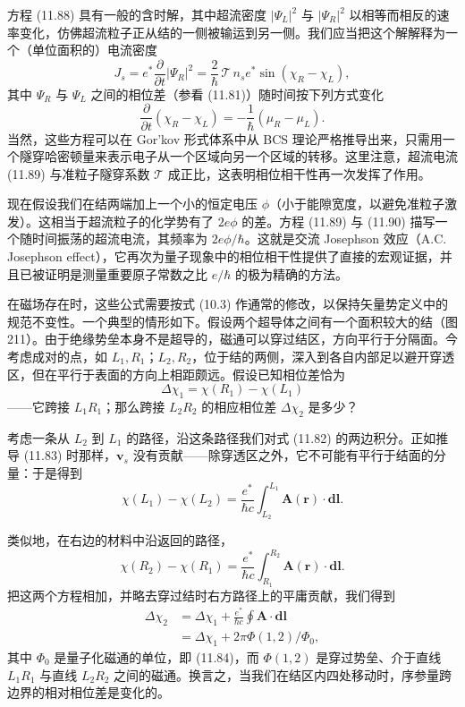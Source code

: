 方程 (11.88) 具有一般的含时解，其中超流密度 $|\Psi_L|^{2}$ 与 $|\Psi_R|^{2}$ 以相等而相反的速率变化，仿佛超流粒子正从结的一侧被输运到另一侧。我们应当把这个解解释为一个（单位面积的）电流密度
\begin{equation*}
J_s = e^{*}\frac{\partial}{\partial t}|\Psi_R|^{2} = \frac{2}{\hbar}\,\mathcal{T}\,n_s e^{*}\sin(\chi_R - \chi_L),
\tag{11.89}
\end{equation*}
其中 $\Psi_R$ 与 $\Psi_L$ 之间的相位差（参看 (11.81)）随时间按下列方式变化
\begin{equation*}
\frac{\partial}{\partial t}(\chi_R - \chi_L) = -\frac{1}{\hbar}(\mu_R - \mu_L).
\tag{11.90}
\end{equation*}
当然，这些方程可以在 Gor'kov 形式体系中从 BCS 理论严格推导出来，只需用一个隧穿哈密顿量来表示电子从一个区域向另一个区域的转移。这里注意，超流电流 (11.89) 与准粒子隧穿系数 $\mathcal{T}$ 成正比，这表明相位相干性再一次发挥了作用。

现在假设我们在结两端加上一个小的恒定电压 $\phi$（小于能隙宽度，以避免准粒子激发）。这相当于超流粒子的化学势有了 $2e\phi$ 的差。方程 (11.89) 与 (11.90) 描写一个随时间振荡的超流电流，其频率为 $2e\phi/\hbar$。这就是交流 Josephson 效应（A.C. Josephson effect），它再次为量子现象中的相位相干性提供了直接的宏观证据，并且已被证明是测量重要原子常数之比 $e/\hbar$ 的极为精确的方法。

在磁场存在时，这些公式需要按式 (10.3) 作通常的修改，以保持矢量势定义中的规范不变性。一个典型的情形如下。假设两个超导体之间有一个面积较大的结（图 211）。由于绝缘势垒本身不是超导的，磁通可以穿过结区，方向平行于分隔面。今考虑成对的点，如 $L_1,R_1$；$L_2,R_2$，位于结的两侧，深入到各自内部足以避开穿透区，但在平行于表面的方向上相距颇远。假设已知相位差恰为
\begin{equation*}
\Delta\chi_1 = \chi(R_1) - \chi(L_1)
\tag{11.91}
\end{equation*}
——它跨接 $L_1R_1$；那么跨接 $L_2R_2$ 的相应相位差 $\Delta\chi_2$ 是多少？

考虑一条从 $L_2$ 到 $L_1$ 的路径，沿这条路径我们对式 (11.82) 的两边积分。正如推导 (11.83) 时那样，$\mathbf{v}_s$ 没有贡献——除穿透区之外，它不可能有平行于结面的分量：于是得到
\begin{equation*}
\chi(L_1) - \chi(L_2) = \frac{e^{*}}{\hbar c}\int_{L_2}^{L_1}\mathbf{A}(\mathbf{r})\cdot\mathbf{dl}.
\tag{11.92}
\end{equation*}


类似地，在右边的材料中沿返回的路径，
\begin{equation*}
\chi(R_2) - \chi(R_1) = \frac{e^{*}}{\hbar c}\int_{R_1}^{R_2}\mathbf{A}(\mathbf{r})\cdot\mathbf{dl}.
\tag{11.93}
\end{equation*}
把这两个方程相加，并略去穿过结时右方路径上的平庸贡献，我们得到
\begin{align*}
\Delta\chi_2 &= \Delta\chi_1 + \frac{e^{*}}{\hbar c}\oint \mathbf{A}\cdot\mathbf{dl}\\
&= \Delta\chi_1 + 2\pi\Phi(1,2)/\Phi_0,
\tag{11.94}
\end{align*}
其中 $\Phi_0$ 是量子化磁通的单位，即 (11.84)，而 $\Phi(1,2)$ 是穿过势垒、介于直线 $L_1R_1$ 与直线 $L_2R_2$ 之间的磁通。换言之，当我们在结区内四处移动时，序参量跨边界的相对相位差是变化的。

